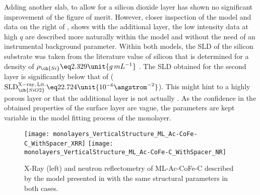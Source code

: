 \documentclass[\main/dresen_thesis.tex]{subfiles}
\begin{document}
  Adding another slab, to allow for a silicon dioxide layer has shown no significant improvement of the figure of merit.
  However, closer inspection of the model and data on the right of , shows  with the additional layer, the low intensity data at high $q$ are described more naturally within the model and without the need of an instrumental background parameter.
  Within both models, the SLD of the silicon substrate was taken from the literature value of silicon that is determined for a density of $\rho_{\ch{Si}} \eq 2.329 \unit{g \, mL^{-1}}$ \cite{Lide_2004_Handb}.
  The SLD obtained for the second layer is significantly below that of  ($\mathrm{SLD}_{\ch{SiO2}}^\mathrm{X-ray, \,Lit.} \eq 22.724 \unit{10^{-6} \angstrom^{-2}}$).
  This might hint to a highly porous layer or that the additional layer is not actually .
  As the confidence in the obtained properties of the surface layer are vague, the parameters are kept variable in the model fitting process of the monolayer.

  \begin{figure}[tb]
    \centering
    \texttt{[image: monolayers\_VerticalStructure\_ML\_Ac-CoFe-C\_WithSpacer\_XRR]}
    \texttt{[image: monolayers\_VerticalStructure\_ML\_Ac-CoFe-C\_WithSpacer\_NR]}
    \caption{\label{fig:monolayers:structure:XRR:ML-Ac-CoFe-C-WithSpacer}X-Ray (left) and neutron
    reflectometry of ML-Ac-CoFe-C described by the model presented in  with the same structural parameters in both cases.}
  \end{figure}
\end{document}
